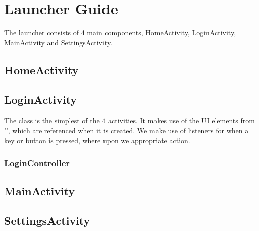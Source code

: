 \chapter{Launcher Guide}

The launcher consists of 4 main components, HomeActivity, LoginActivity,
MainActivity and SettingsActivity.

\section{HomeActivity}

\section{LoginActivity}

The  class is the simplest of the 4 activities. It makes
use of the UI elements from '', which are
referenced when it is created. We make use of listeners for when a key or button is pressed,
where upon we appropriate action. 

\subsection{LoginController}


\section{MainActivity}

\section{SettingsActivity}
